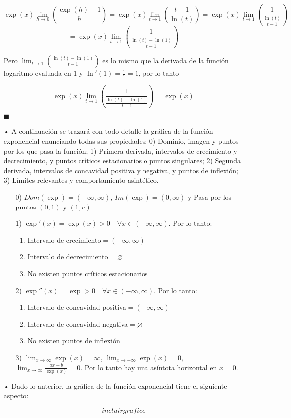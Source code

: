 \documentclass[pts12]{article}
\numberwithin{equation}{section}
\newcommand{\Col}{\color{ProcessBlue}}
\begin{document}
\begin{itemize}
$$ \exp(x)\lim_{h\to 0}\left(\frac{\exp(h)-1}{h}\right)=\exp(x)\lim_{t\to 1}\left(\frac{t-1}{\ln(t)}\right)=\exp(x)\lim_{t\to 1}\left(\frac{1}{\frac{\ln(t)}{t-1}}\right) $$
$$ =\exp(x)\lim_{t\to 1}\left(\frac{1}{\frac{\ln(t)-\ln(1)}{t-1}}\right) $$

Pero $ \lim_{t\to 1}\left(\frac{\ln(t)-\ln(1)}{t-1}\right) $ es lo mismo que la derivada de la función logaritmo evaluada en $1$ y $\ln'(1)=\frac{1}{1}=1$, por lo tanto

$$ \exp(x)\lim_{t\to 1}\left(\frac{1}{\frac{\ln(t)-\ln(1)}{t-1}}\right)=\exp(x) $$

\begin{flushright}
$\blacksquare$
\end{flushright}

\item[\Col •] A continuación se trazará con todo detalle la gráfica de la función exponencial enunciando todas sus propiedades: 0) Dominio, imagen y puntos por los que pasa la función; 1) Primera derivada, intervalos de crecimiento y decrecimiento, y puntos críticos estacionarios o puntos singulares; 2) Segunda derivada, intervalos de concavidad positiva y negativa, y puntos de inflexión; 3) Límites relevantes y comportamiento asintótico. 

\begin{enumerate}
\item[0)] $Dom(\exp)=(-\infty,\infty)$, $Im(\exp)=(0,\infty)$ y Pasa por los puntos $(0,1)$ y $(1,e)$.
\item[1)] $\exp'(x)=\exp(x)>0 \quad \forall x\in (-\infty,\infty)$. Por lo tanto:
\begin{enumerate}
\item Intervalo de crecimiento$=(-\infty,\infty)$
\item Intervalo de decrecimiento$=\varnothing$
\item No existen puntos críticos estacionarios
\end{enumerate} 
\item[2)] $\exp''(x)=\exp>0 \quad \forall x\in (-\infty,\infty)$. Por lo tanto:
\begin{enumerate}
\item Intervalo de concavidad positiva$=(-\infty,\infty)$
\item Intervalo de concavidad negativa$=\varnothing$
\item No existen puntos de inflexión
\end{enumerate}
\item[3)] $\lim_{x\to\infty}\exp(x)=\infty$, $\lim_{x\to -\infty}\exp(x)=0$, $\lim_{x\to\infty}\frac{ax+b}{\exp(x)}=0$. Por lo tanto hay una asíntota horizontal en $x=0$.
\end{enumerate}

\item[\Col •] Dado lo anterior, la gráfica de la función exponencial tiene el siguiente aspecto:

$$ incluir grafico $$

\end{itemize}
\end{document}

